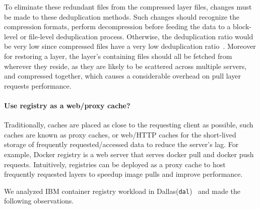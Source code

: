 To eliminate these redundant files from the compressed layer files, changes must be made to these deduplication methods. 
Such changes should recognize the compression formats, perform decompression before feeding the data to a block-level or file-level deduplication process. 
Otherwise, the deduplication ratio would be very low since compressed files have a very low deduplication ratio~\cite{xxx}. 
Moreover for restoring a layer, the layer's
containing files should all be fetched from wherever they reside, as they are likely to be scattered across multiple servers, 
and compressed together, which causes a considerable overhead on pull layer requests performance.

\paragraph{Use registry as a web/proxy cache?}
Traditionally, caches are placed as close to the requesting client as possible, 
such caches are known as proxy caches, or web/HTTP caches for the short-lived storage of 
frequently requested/accessed data to reduce the server's lag. 
For example, 
Docker registry is a web server that serves docker pull and docker push requests.
Intuitively, registries can be deployed as a proxy cache to host frequently requested layers to speedup image pulls and improve performance. 

We analyzed IBM container registry workload in Dallas(\texttt{dal})~\cite{dockerworkload} and made the following observations.


